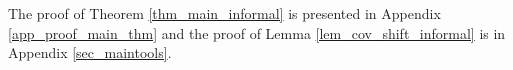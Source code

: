 The proof of Theorem \ref{thm_main_informal} is presented in Appendix \ref{app_proof_main_thm} and the proof of Lemma \ref{lem_cov_shift_informal} is in Appendix \ref{sec_maintools}.




